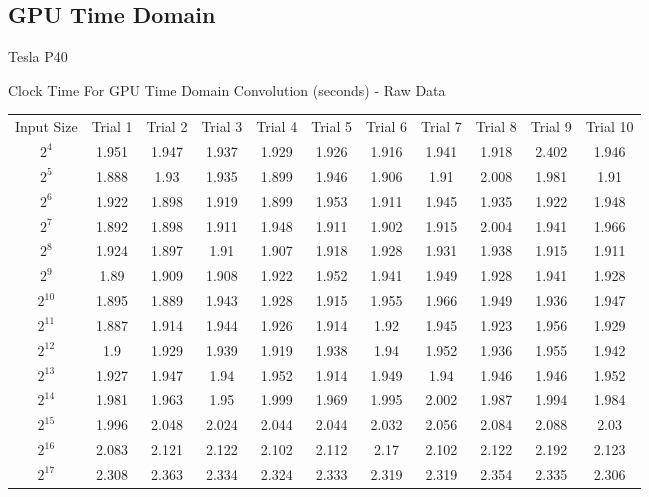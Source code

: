 \subsection{GPU Time Domain}
\begin{center}
\begin{landscape}
    Tesla P40
    
    Clock Time For GPU Time Domain Convolution (seconds) - Raw Data
    
    \begin{tabular}{c|c|c|c|c|c|c|c|c|c|c}
        Input Size & Trial 1 & Trial 2 & Trial 3 & Trial 4 & Trial 5 & Trial 6 & Trial 7 & Trial 8 & Trial 9 & Trial 10 \\
        $2^4$ & 1.951 & 1.947 & 1.937 & 1.929 & 1.926 & 1.916 & 1.941 & 1.918 & 2.402 & 1.946 \\
        $2^5$ & 1.888 & 1.93 & 1.935 & 1.899 & 1.946 & 1.906 & 1.91 & 2.008 & 1.981 & 1.91 \\
        $2^6$ & 1.922 & 1.898 & 1.919 & 1.899 & 1.953 & 1.911 & 1.945 & 1.935 & 1.922 & 1.948 \\
        $2^7$ & 1.892 & 1.898 & 1.911 & 1.948 & 1.911 & 1.902 & 1.915 & 2.004 & 1.941 & 1.966 \\
        $2^8$ & 1.924 & 1.897 & 1.91 & 1.907 & 1.918 & 1.928 & 1.931 & 1.938 & 1.915 & 1.911 \\
        $2^9$ & 1.89 & 1.909 & 1.908 & 1.922 & 1.952 & 1.941 & 1.949 & 1.928 & 1.941 & 1.928 \\
        $2^{10}$ & 1.895 & 1.889 & 1.943 & 1.928 & 1.915 & 1.955 & 1.966 & 1.949 & 1.936 & 1.947 \\
        $2^{11}$ & 1.887 & 1.914 & 1.944 & 1.926 & 1.914 & 1.92 & 1.945 & 1.923 & 1.956 & 1.929 \\
        $2^{12}$ & 1.9 & 1.929 & 1.939 & 1.919 & 1.938 & 1.94 & 1.952 & 1.936 & 1.955 & 1.942 \\
        $2^{13}$ & 1.927 & 1.947 & 1.94 & 1.952 & 1.914 & 1.949 & 1.94 & 1.946 & 1.946 & 1.952 \\
        $2^{14}$ & 1.981 & 1.963 & 1.95 & 1.999 & 1.969 & 1.995 & 2.002 & 1.987 & 1.994 & 1.984 \\
        $2^{15}$ & 1.996 & 2.048 & 2.024 & 2.044 & 2.044 & 2.032 & 2.056 & 2.084 & 2.088 & 2.03 \\
        $2^{16}$ & 2.083 & 2.121 & 2.122 & 2.102 & 2.112 & 2.17 & 2.102 & 2.122 & 2.192 & 2.123 \\
        $2^{17}$ & 2.308 & 2.363 & 2.334 & 2.324 & 2.333 & 2.319 & 2.319 & 2.354 & 2.335 & 2.306 \\

\end{tabular}
\end{landscape}
\end{center}
